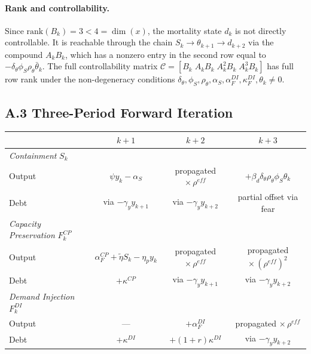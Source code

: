 \documentclass[12pt, a4paper]{article}
\begin{document}
\paragraph{Rank and controllability.} Since $\text{rank}(B_k) = 3 < 4 = \dim(x)$, the mortality state $d_k$ is not directly controllable. It is reachable through the chain $S_k \to \theta_{k+1} \to d_{k+2}$ via the compound $A_k B_k$, which has a nonzero entry in the second row equal to $-\delta_\theta \phi_S \rho_\theta \bar{\theta}_k$. The full controllability matrix $\mathcal{C} = [B_k \; A_k B_k \; A_k^2 B_k \; A_k^3 B_k]$ has full row rank under the non-degeneracy conditions $\delta_\theta, \phi_S, \rho_\theta, \alpha_S, \alpha_F^{DI}, \kappa_F^{DI}, \theta_k \neq 0$.

\subsection*{A.3 Three-Period Forward Iteration}
\label{subsec:iteration}

%
\begin{center}
\small
\begin{tabular}{lccc}
\toprule
 & $k+1$ & $k+2$ & $k+3$ \\
\midrule
\textit{Containment} $S_k$ \\
\quad Output & $\psi y_k - \alpha_S$ & propagated $\times\, \rho^{eff}$ & $+\beta_d \delta_\theta \rho_\theta \phi_S \theta_k$ \\
\quad Debt & via $-\gamma_y y_{k+1}$ & via $-\gamma_y y_{k+2}$ & partial offset via fear \\[4pt]
\textit{Capacity Preservation} $F^{CP}_k$ \\
\quad Output & $\alpha^{CP}_F + \tilde{\eta} S_k - \eta_p y_k$ & propagated $\times\, \rho^{eff}$ & propagated $\times\, (\rho^{eff})^2$ \\
\quad Debt & $+\kappa^{CP}$ & via $-\gamma_y y_{k+1}$ & via $-\gamma_y y_{k+2}$ \\[4pt]
\textit{Demand Injection} $F^{DI}_k$ \\
\quad Output & --- & $+\alpha^{DI}_F$ & propagated $\times\, \rho^{eff}$ \\
\quad Debt & $+\kappa^{DI}$ & $+(1+r)\kappa^{DI}$ & via $-\gamma_y y_{k+2}$ \\
\bottomrule
\end{tabular}
\end{center}
\end{document}
